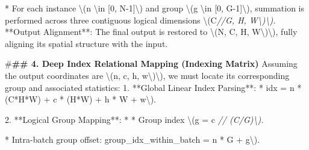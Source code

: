 \documentclass[
  10
]{article}
\newenvironment{Shaded}{}{}
\newcommand{\CommentTok}[1]{\textcolor[rgb]{0.38,0.63,0.69}{\textit{#1}}}
\newcommand{\DecValTok}[1]{\textcolor[rgb]{0.25,0.63,0.44}{#1}}
\newcommand{\ErrorTok}[1]{\textcolor[rgb]{1.00,0.00,0.00}{\textbf{#1}}}
\newcommand{\FloatTok}[1]{\textcolor[rgb]{0.25,0.63,0.44}{#1}}
\newcommand{\NormalTok}[1]{#1}
\newcommand{\OperatorTok}[1]{\textcolor[rgb]{0.40,0.40,0.40}{#1}}
\newcommand{\PreprocessorTok}[1]{\textcolor[rgb]{0.74,0.48,0.00}{#1}}
\begin{document}
\begin{Shaded}
\begin{Highlighting}[]
\OperatorTok{*}\NormalTok{ For each instance \textbackslash{}}\OperatorTok{(}\NormalTok{n \textbackslash{}in }\OperatorTok{[}\DecValTok{0}\OperatorTok{,}\NormalTok{ N}\OperatorTok{{-}}\DecValTok{1}\OperatorTok{]}\NormalTok{\textbackslash{}}\OperatorTok{)}\NormalTok{ and group \textbackslash{}}\OperatorTok{(}\NormalTok{g \textbackslash{}in }\OperatorTok{[}\DecValTok{0}\OperatorTok{,}\NormalTok{ G}\OperatorTok{{-}}\DecValTok{1}\OperatorTok{]}\NormalTok{\textbackslash{}}\OperatorTok{),}\NormalTok{ summation is performed across three contiguous logical dimensions \textbackslash{}}\OperatorTok{(}\NormalTok{C}\CommentTok{//G, H, W\textbackslash{})\textbackslash{}).}
\OperatorTok{**}\NormalTok{Output Alignment}\OperatorTok{**:}\NormalTok{ The final output is restored to \textbackslash{}}\OperatorTok{(}\NormalTok{N}\OperatorTok{,}\NormalTok{ C}\OperatorTok{,}\NormalTok{ H}\OperatorTok{,}\NormalTok{ W\textbackslash{}}\OperatorTok{)}\NormalTok{\textbackslash{}}\OperatorTok{),}\NormalTok{ fully aligning its spatial structure with the input}\OperatorTok{.}

\PreprocessorTok{\#}\ErrorTok{\#\# 4. Deep Index Relational Mapping (Indexing Matrix)}
\NormalTok{Assuming the output coordinates are \textbackslash{}}\OperatorTok{(}\NormalTok{n}\OperatorTok{,}\NormalTok{ c}\OperatorTok{,}\NormalTok{ h}\OperatorTok{,}\NormalTok{ w\textbackslash{}}\OperatorTok{)}\NormalTok{\textbackslash{}}\OperatorTok{),}\NormalTok{ we must locate its corresponding group and associated statistics}\OperatorTok{:}
\FloatTok{1.} \OperatorTok{**}\NormalTok{Global Linear Index Parsing}\OperatorTok{**:} \OperatorTok{*}
\NormalTok{    \textasciigrave{}idx }\OperatorTok{=}\NormalTok{ n }\OperatorTok{*} \OperatorTok{(}\NormalTok{C}\OperatorTok{*}\NormalTok{H}\OperatorTok{*}\NormalTok{W}\OperatorTok{)} \OperatorTok{+}\NormalTok{ c }\OperatorTok{*} \OperatorTok{(}\NormalTok{H}\OperatorTok{*}\NormalTok{W}\OperatorTok{)} \OperatorTok{+}\NormalTok{ h }\OperatorTok{*}\NormalTok{ W }\OperatorTok{+}\NormalTok{ w\textbackslash{}}\OperatorTok{).}

\FloatTok{2.} \OperatorTok{**}\NormalTok{Logical Group Mapping}\OperatorTok{**:} \OperatorTok{*}
    \OperatorTok{*}\NormalTok{ Group index \textbackslash{}}\OperatorTok{(}\NormalTok{g }\OperatorTok{=}\NormalTok{ c }\CommentTok{// (C/G)\textbackslash{}).}

    \OperatorTok{*}\NormalTok{ Intra}\OperatorTok{{-}}\NormalTok{batch group offset}\OperatorTok{:}\NormalTok{ \textasciigrave{}group\_idx\_within\_batch }\OperatorTok{=}\NormalTok{ n }\OperatorTok{*}\NormalTok{ G }\OperatorTok{+}\NormalTok{ g\textbackslash{}}\OperatorTok{).}


\end{Highlighting}
\end{Shaded}
\end{document}
